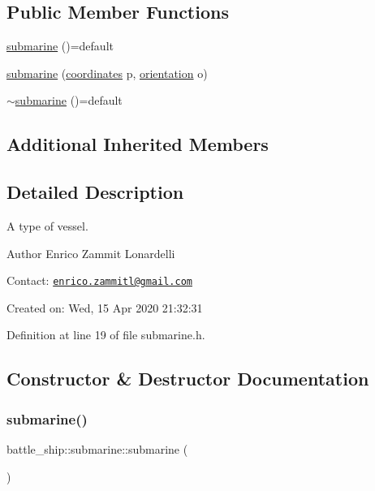 \subsection*{Public Member Functions}
\begin{DoxyCompactItemize}
\item 
\hyperlink{classbattle__ship_1_1submarine_a52a8062290d2f36e162fc033a3917c5a}{submarine} ()=default
\item 
\hyperlink{classbattle__ship_1_1submarine_a229d0577e45bd964f4d32b50506c9504}{submarine} (\hyperlink{structbattle__ship_1_1coordinates}{coordinates} p, \hyperlink{namespacebattle__ship_aed87488f0a73f0d0679fe343fb61c784}{orientation} o)
\item 
\hyperlink{classbattle__ship_1_1submarine_a03b3a1b0c62de507e2b3a4d9ec1de06f}{$\sim$submarine} ()=default
\end{DoxyCompactItemize}
\subsection*{Additional Inherited Members}


\subsection{Detailed Description}
A type of vessel. 

\begin{DoxyAuthor}{Author}
Enrico Zammit Lonardelli
\end{DoxyAuthor}
Contact\+: \href{mailto:enrico.zammitl@gmail.com}{\tt enrico.\+zammitl@gmail.\+com}

Created on\+: Wed, 15 Apr 2020 21\+:32\+:31 

Definition at line 19 of file submarine.\+h.



\subsection{Constructor \& Destructor Documentation}
\mbox{\label{classbattle__ship_1_1submarine_a52a8062290d2f36e162fc033a3917c5a}} 
\subsubsection{\texorpdfstring{submarine()}{submarine()}\hspace{0.1cm}{\footnotesize\ttfamily [1/2]}}
{\footnotesize\ttfamily battle\+\_\+ship\+::submarine\+::submarine (\begin{DoxyParamCaption}{ }\end{DoxyParamCaption})\hspace{0.3cm}{\ttfamily [default]}}

